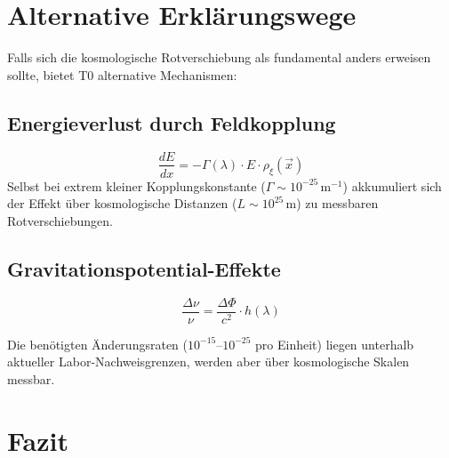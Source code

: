 \section{Alternative Erklärungswege}

	Falls sich die kosmologische Rotverschiebung als fundamental anders erweisen sollte, bietet T0 alternative Mechanismen:

	\subsection{Energieverlust durch Feldkopplung}
	\begin{equation}
		\frac{dE}{dx} = -\Gamma(\lambda) \cdot E \cdot \rho_\xi(\vec{x})
	\end{equation}
	Selbst bei extrem kleiner Kopplungskonstante ($\Gamma \sim 10^{-25}\,\text{m}^{-1}$) akkumuliert sich der Effekt über kosmologische Distanzen ($L \sim 10^{25}\,$m) zu messbaren Rotverschiebungen.

	\subsection{Gravitationspotential-Effekte}
	\begin{equation}
		\frac{\Delta\nu}{\nu} = \frac{\Delta\Phi}{c^2} \cdot h(\lambda)
	\end{equation}

	Die benötigten Änderungsraten ($10^{-15}$--$10^{-25}$ pro Einheit) liegen unterhalb aktueller Labor-Nachweisgrenzen, werden aber über kosmologische Skalen messbar.

\section{Fazit}

	\begin{center}
	\end{center}

